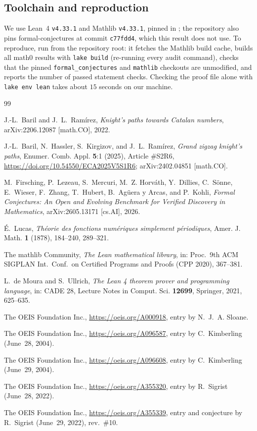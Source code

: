 \documentclass[11pt]{amsart}
\theoremstyle{plain}
\theoremstyle{definition}
\begin{document}
\subsection*{Toolchain and reproduction}
We use Lean~4 \cite{Lean4} \texttt{v4.33.1} and Mathlib \cite{Mathlib} \texttt{v4.33.1}, pinned in ; the repository also pins formal-conjectures \cite{FC} at commit \texttt{c77fdd4}, which this result does not use.
To reproduce, run  from the repository root: it fetches the Mathlib build cache, builds all math0 results with \texttt{lake build} (re-running every audit command), checks that the pinned \texttt{formal\_conjectures} and \texttt{mathlib} checkouts are unmodified, and reports the number of passed statement checks. Checking the proof file alone with \texttt{lake env lean} takes about $15$ seconds on our machine.

{\footnotesize\raggedright
\begin{thebibliography}{99}

J.-L.~Baril and J.~L.~Ram\'irez, \emph{Knight's paths towards Catalan numbers}, arXiv:2206.12087 [math.CO], 2022.

J.-L.~Baril, N.~Hassler, S.~Kirgizov, and J.~L.~Ram\'irez, \emph{Grand zigzag knight's paths}, Enumer. Comb. Appl. \textbf{5}:1 (2025), Article \#S2R6, \url{https://doi.org/10.54550/ECA2025V5S1R6}; arXiv:2402.04851 [math.CO].

M.~Firsching, P.~Lezeau, S.~Mercuri, M.~Z. Horv\'ath, Y.~Dillies, C.~S\"onne, E.~Wieser, F.~Zhang, T.~Hubert, B.~Ag\"uera y Arcas, and P.~Kohli, \emph{Formal Conjectures: An Open and Evolving Benchmark for Verified Discovery in Mathematics}, arXiv:2605.13171 [cs.AI], 2026.

\'E.~Lucas, \emph{Th\'eorie des fonctions num\'eriques simplement p\'eriodiques}, Amer. J. Math. \textbf{1} (1878), 184--240, 289--321.

The mathlib Community, \emph{The Lean mathematical library}, in: Proc.\ 9th ACM SIGPLAN Int.\ Conf.\ on Certified Programs and Proofs (CPP 2020), 367--381.

L.~de Moura and S.~Ullrich, \emph{The Lean 4 theorem prover and programming language}, in: CADE 28, Lecture Notes in Comput. Sci. \textbf{12699}, Springer, 2021, 625--635.

The OEIS Foundation Inc., \url{https://oeis.org/A000918}, entry by N.~J.~A. Sloane.

The OEIS Foundation Inc., \url{https://oeis.org/A096587}, entry by C.~Kimberling (June~28, 2004).

The OEIS Foundation Inc., \url{https://oeis.org/A096608}, entry by C.~Kimberling (June~29, 2004).

The OEIS Foundation Inc., \url{https://oeis.org/A355320}, entry by R.~Sigrist (June~28, 2022).

The OEIS Foundation Inc., \url{https://oeis.org/A355339}, entry and conjecture by R.~Sigrist (June~29, 2022), rev.~\#10.

\end{thebibliography}
}
\end{document}
